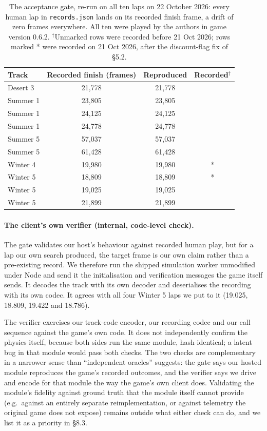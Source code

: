 \documentclass[11pt]{article}
\begin{document}
\begin{table}[h]
\centering
\small
\begin{tabular}{@{}lccc@{}}
\toprule
\textbf{Track} & \textbf{Recorded finish (frames)} & \textbf{Reproduced} & \textbf{Recorded}$^{\dagger}$ \\
\midrule
Desert 3  & 21,778 & 21,778 & \\
Summer 1  & 23,805 & 23,805 & \\
Summer 1  & 24,125 & 24,125 & \\
Summer 1  & 24,778 & 24,778 & \\
Summer 5  & 57,037 & 57,037 & \\
Summer 5  & 61,428 & 61,428 & \\
Winter 4  & 19,980 & 19,980 & * \\
Winter 5  & 18,809 & 18,809 & * \\
Winter 5  & 19,025 & 19,025 & \\
Winter 5  & 21,899 & 21,899 & \\
\bottomrule
\end{tabular}
\caption{The acceptance gate, re-run on all ten laps on 22 October 2026: every human lap in \texttt{records.json} lands on its recorded finish frame, a drift of zero frames everywhere. All ten were played by the authors in game version 0.6.2. $^{\dagger}$Unmarked rows were recorded before 21 Oct 2026; rows marked * were recorded on 21 Oct 2026, after the discount-flag fix of \S5.2.}
\label{tab:gate}
\end{table}

\paragraph{The client's own verifier (internal, code-level check).} The gate validates our host's behaviour against recorded human play, but for a lap our own search produced, the target frame is our own claim rather than a pre-existing record. We therefore run the shipped simulation worker unmodified under Node and send it the initialisation and verification messages the game itself sends. It decodes the track with its own decoder and deserialises the recording with its own codec. It agrees with all four Winter 5 laps we put to it (19.025, 18.809, 19.422 and 18.786).

The verifier exercises our track-code encoder, our recording codec and our call sequence against the game's own code. It does not independently confirm the physics itself, because both sides run the same module, hash-identical; a latent bug in that module would pass both checks. The two checks are complementary in a narrower sense than ``independent oracles'' suggests: the gate says our hosted module reproduces the game's recorded outcomes, and the verifier says we drive and encode for that module the way the game's own client does. Validating the module's fidelity against ground truth that the module itself cannot provide (e.g.\ against an entirely separate reimplementation, or against telemetry the original game does not expose) remains outside what either check can do, and we list it as a priority in \S8.3.
\end{document}
